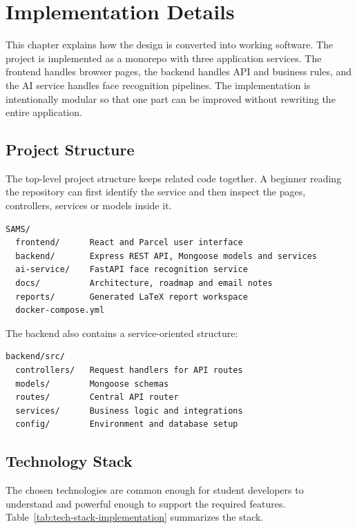 \chapter{Implementation Details}
\label{chap:implementation}

This chapter explains how the design is converted into working software. The project is implemented as a monorepo with three application services. The frontend handles browser pages, the backend handles API and business rules, and the AI service handles face recognition pipelines. The implementation is intentionally modular so that one part can be improved without rewriting the entire application.

\section{Project Structure}

The top-level project structure keeps related code together. A beginner reading the repository can first identify the service and then inspect the pages, controllers, services or models inside it.

\begin{verbatim}
SAMS/
  frontend/      React and Parcel user interface
  backend/       Express REST API, Mongoose models and services
  ai-service/    FastAPI face recognition service
  docs/          Architecture, roadmap and email notes
  reports/       Generated LaTeX report workspace
  docker-compose.yml
\end{verbatim}

The backend also contains a service-oriented structure:

\begin{verbatim}
backend/src/
  controllers/   Request handlers for API routes
  models/        Mongoose schemas
  routes/        Central API router
  services/      Business logic and integrations
  config/        Environment and database setup
\end{verbatim}

\section{Technology Stack}

The chosen technologies are common enough for student developers to understand and powerful enough to support the required features. Table~\ref{tab:tech-stack-implementation} summarizes the stack.


